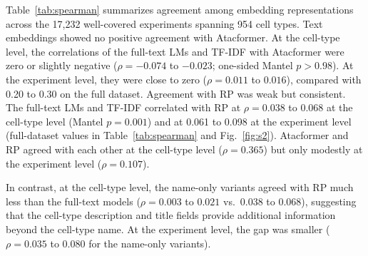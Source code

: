 \documentclass[12pt]{article}
\begin{document}
Table~\ref{tab:spearman} summarizes agreement among embedding representations
across the 17,232 well-covered experiments spanning 954 cell types. Text
embeddings showed no positive agreement with Atacformer. At the cell-type
level, the correlations of the full-text LMs and TF-IDF with Atacformer were
zero or slightly negative ($\rho = -0.074$ to $-0.023$; one-sided Mantel
$p > 0.98$). At the experiment level, they were close to zero
($\rho = 0.011$ to $0.016$), compared with 0.20 to 0.30 on the full dataset.
Agreement with RP was weak but consistent. The full-text LMs and TF-IDF
correlated with RP at $\rho = 0.038$ to $0.068$ at the cell-type level (Mantel
$p = 0.001$) and at 0.061 to 0.098 at the experiment level (full-dataset
values in Table~\ref{tab:spearman} and Fig.~\ref{fig:s2}). Atacformer and RP
agreed with each other at the cell-type level ($\rho = 0.365$) but only
modestly at the experiment level ($\rho = 0.107$).

In contrast, at the cell-type level, the name-only variants agreed with RP
much less than the full-text models ($\rho = 0.003$ to $0.021$ vs.\ 0.038 to
0.068), suggesting that the cell-type description and title fields provide
additional information beyond the cell-type name. At the experiment level,
the gap was smaller ($\rho = 0.035$ to $0.080$ for the name-only variants).
\end{document}
